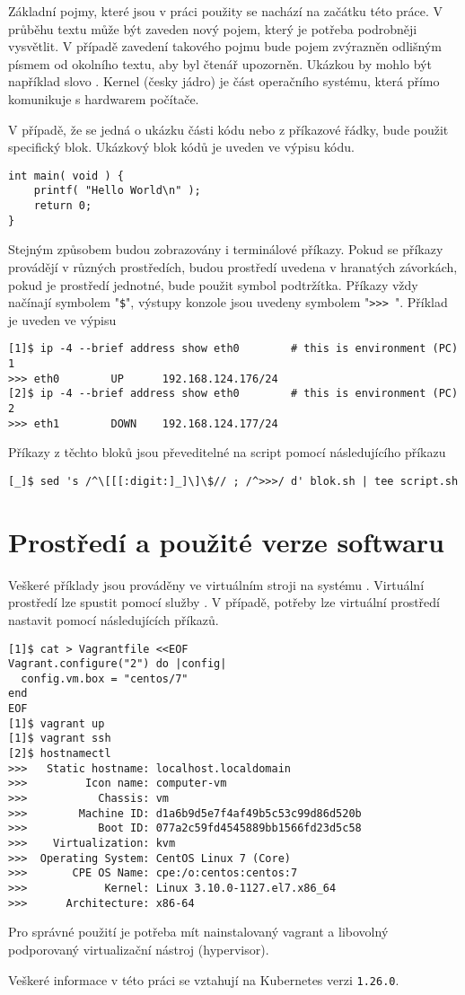 Základní pojmy, které jsou v práci použity se nachází na začátku této práce. V průběhu textu může být zaveden nový pojem, který je potřeba podrobněji vysvětlit. V případě zavedení takového pojmu bude pojem zvýrazněn odlišným písmem od okolního textu, aby byl čtenář upozorněn. Ukázkou by mohlo být například slovo . Kernel (česky jádro) je část operačního systému, která přímo komunikuje s hardwarem počítače.  

V případě, že se jedná o ukázku části kódu nebo z příkazové řádky, bude použit specifický blok. Ukázkový blok kódů je uveden ve výpisu kódu.

\begin{verbatim}
int main( void ) {
    printf( "Hello World\n" );
    return 0;
}
\end{verbatim}


Stejným způsobem budou zobrazovány i terminálové příkazy. Pokud se příkazy provádějí v různých prostředích, budou prostředí uvedena v hranatých závorkách, pokud je prostředí jednotné, bude použit symbol podtržítka. Příkazy vždy načínají symbolem "\verb|$|", výstupy konzole jsou uvedeny symbolem "\verb|>>> |". Příklad je uveden ve výpisu

\begin{verbatim}
[1]$ ip -4 --brief address show eth0        # this is environment (PC) 1
>>> eth0        UP      192.168.124.176/24
[2]$ ip -4 --brief address show eth0        # this is environment (PC) 2
>>> eth1        DOWN    192.168.124.177/24
\end{verbatim}


Příkazy z těchto bloků jsou převeditelné na script pomocí následujícího příkazu 
\begin{verbatim}
[_]$ sed 's /^\[[[:digit:]_]\]\$// ; /^>>>/ d' blok.sh | tee script.sh
\end{verbatim}

\section{Prostředí a použité verze softwaru}
Veškeré příklady jsou prováděny ve virtuálním stroji na systému . Virtuální prostředí lze spustit pomocí služby . V případě, potřeby lze virtuální prostředí nastavit pomocí následujících příkazů.
\begin{verbatim}
[1]$ cat > Vagrantfile <<EOF
Vagrant.configure("2") do |config|
  config.vm.box = "centos/7"
end
EOF
[1]$ vagrant up
[1]$ vagrant ssh
[2]$ hostnamectl
>>>   Static hostname: localhost.localdomain
>>>         Icon name: computer-vm
>>>           Chassis: vm
>>>        Machine ID: d1a6b9d5e7f4af49b5c53c99d86d520b
>>>           Boot ID: 077a2c59fd4545889bb1566fd23d5c58
>>>    Virtualization: kvm
>>>  Operating System: CentOS Linux 7 (Core)
>>>       CPE OS Name: cpe:/o:centos:centos:7
>>>            Kernel: Linux 3.10.0-1127.el7.x86_64
>>>      Architecture: x86-64
\end{verbatim}

Pro správné použití je potřeba mít nainstalovaný vagrant a libovolný podporovaný virtualizační nástroj (hypervisor).

Veškeré informace v této práci se vztahují na Kubernetes verzi \verb|1.26.0|.